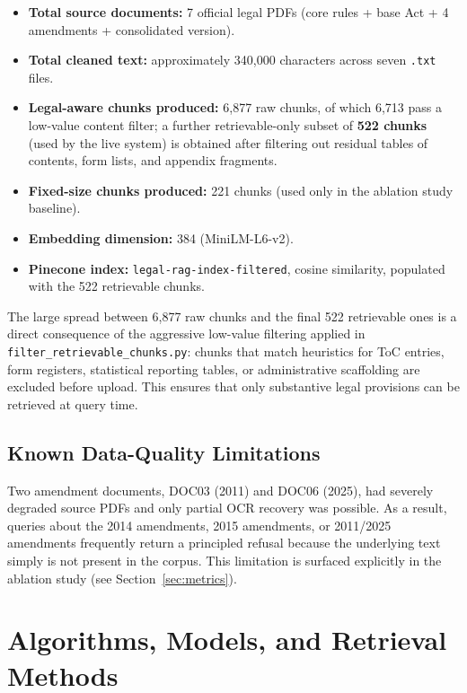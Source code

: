 \documentclass[11pt,a4paper]{article}
\begin{document}
\begin{itemize}[leftmargin=*]
    \item \textbf{Total source documents:} 7 official legal PDFs (core rules + base Act + 4 amendments + consolidated version).
    \item \textbf{Total cleaned text:} approximately 340{,}000 characters across seven \texttt{.txt} files.
    \item \textbf{Legal-aware chunks produced:} 6{,}877 raw chunks, of which 6{,}713 pass a low-value content filter; a further retrievable-only subset of \textbf{522 chunks} (used by the live system) is obtained after filtering out residual tables of contents, form lists, and appendix fragments.
    \item \textbf{Fixed-size chunks produced:} 221 chunks (used only in the ablation study baseline).
    \item \textbf{Embedding dimension:} 384 (MiniLM-L6-v2).
    \item \textbf{Pinecone index:} \texttt{legal-rag-index-filtered}, cosine similarity, populated with the 522 retrievable chunks.
\end{itemize}

The large spread between 6{,}877 raw chunks and the final 522 retrievable ones is a direct consequence of the aggressive low-value filtering applied in \texttt{filter\_retrievable\_chunks.py}: chunks that match heuristics for ToC entries, form registers, statistical reporting tables, or administrative scaffolding are excluded before upload. This ensures that only substantive legal provisions can be retrieved at query time.

\subsection{Known Data-Quality Limitations}

Two amendment documents, DOC03 (2011) and DOC06 (2025), had severely degraded source PDFs and only partial OCR recovery was possible. As a result, queries about the 2014 amendments, 2015 amendments, or 2011/2025 amendments frequently return a principled refusal because the underlying text simply is not present in the corpus. This limitation is surfaced explicitly in the ablation study (see Section~\ref{sec:metrics}).

\newpage
\section{Algorithms, Models, and Retrieval Methods}
\label{sec:methods}
\end{document}
